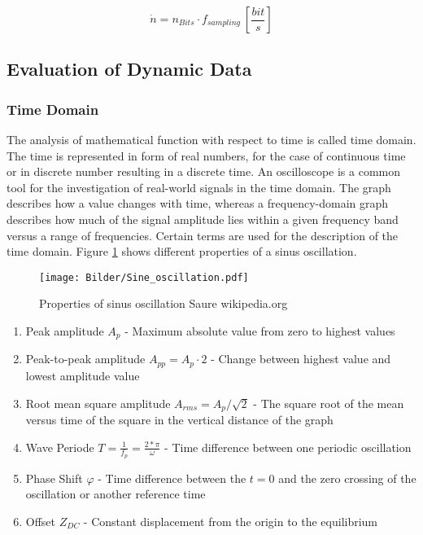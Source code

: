 \begin{equation}
\dot n = n_{Bits}\cdot f_{sampling} ~ [\frac{bit}{s}]
\label{eq:datastream} 
\end{equation}
 
\subsection{Evaluation of Dynamic Data}

\subsubsection{Time Domain}
The analysis of mathematical function with respect to time is called time domain. The time is represented in form of real numbers, for the case of continuous time or in discrete number resulting in a discrete time. An oscilloscope is a common tool for the investigation of real-world signals in the time domain. The graph describes how a value changes with time, whereas a frequency-domain graph describes how much of the signal amplitude lies within a given frequency band versus a range of frequencies. Certain terms are used for the description of the time domain. Figure \ref{fig:sinus} shows different properties of a sinus oscillation.  

\begin{figure}[!h]
	\centering
	\texttt{[image: Bilder/Sine\_oscillation.pdf]}
	\caption{Properties of sinus oscillation \tiny Saure wikipedia.org}
	\label{fig:sinus}
\end{figure}

\begin{enumerate}
\setlength\itemsep{0.001em} 
\item Peak amplitude $A_{p}$ - Maximum absolute value from zero to highest values
\item Peak-to-peak amplitude $A_{pp}=A_{p}\cdot 2$ - Change between highest value and lowest amplitude value
\item Root mean square amplitude $A_{rms}=A_{p}/\sqrt{2}$ - The square root of the mean versus time of the square in the vertical distance of the graph
\item Wave Periode $T=\frac{1}{f_{p}}=\frac{2*\pi}{\omega}$ - Time difference between one periodic oscillation
\item Phase Shift $\varphi$ - Time difference between the $t=0$ and the zero crossing of the oscillation or another reference time
\item Offset $Z_{DC} $ - Constant displacement from the origin to the equilibrium
\end{enumerate}	
	

